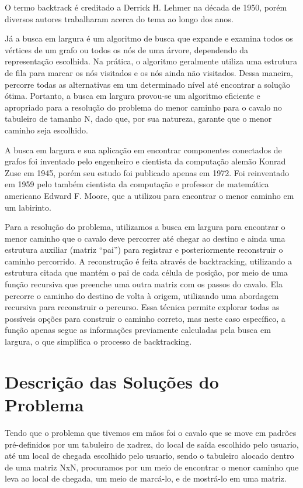 \documentclass[relatorio]{IEEEtran}
\begin{document}
O termo backtrack é creditado a Derrick H. Lehmer na década de 1950, porém diversos autores trabalharam acerca do tema ao longo dos anos.

Já a busca em largura é um algoritmo de busca que expande e examina todos os vértices de um grafo ou todos os nós de uma árvore, dependendo da representação escolhida. Na prática, o algoritmo geralmente utiliza uma estrutura de fila para marcar os nós visitados e os nós ainda não visitados. Dessa maneira, percorre todas as alternativas em um determinado nível até encontrar a solução ótima. Portanto, a busca em largura provou-se um algoritmo eficiente e apropriado para a resolução do problema do menor caminho para o cavalo no tabuleiro de tamanho N, dado que, por sua natureza, garante que o menor caminho seja escolhido.

A busca em largura e sua aplicação em encontrar componentes conectados de grafos foi inventado pelo engenheiro e cientista da computação alemão Konrad Zuse em 1945, porém seu estudo foi publicado apenas em 1972. Foi reinventado em 1959 pelo também cientista da computação e professor de matemática americano Edward F. Moore, que a utilizou para encontrar o menor caminho em um labirinto.

Para a resolução do problema, utilizamos a busca em largura para encontrar o menor caminho que o cavalo deve percorrer até chegar ao destino e ainda uma estrutura auxiliar (matriz “pai”) para registrar e posteriormente reconstruir o caminho percorrido. A reconstrução é feita através de backtracking, utilizando a estrutura citada que mantém o pai de cada célula de posição, por meio de uma função recursiva que preenche uma outra matriz com os passos do cavalo. Ela percorre o caminho do destino de volta à origem, utilizando uma abordagem recursiva para reconstruir o percurso. Essa técnica permite explorar todas as possíveis opções para construir o caminho correto, mas neste caso específico, a função apenas segue as informações previamente calculadas pela busca em largura, o que simplifica o processo de backtracking.

\section{Descrição das Soluções do Problema}
Tendo que o problema que tivemos em mãos foi o cavalo que se move em padrões pré-definidos por um tabuleiro de xadrez, do local de saída escolhido pelo usuario, até um local de chegada escolhido pelo usuario, sendo o tabuleiro alocado dentro de uma matriz NxN, procuramos por um meio de encontrar o menor caminho que leva ao local de chegada, um meio de marcá-lo, e de mostrá-lo em uma matriz. 
\end{document}
